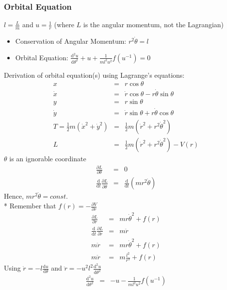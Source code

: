 \subsubsection{Orbital Equation}
\(l=\frac{L}{m}\) and \(u=\frac{1}{r}\) (where \(L\) is the angular momentum, not the Lagrangian)
\begin{itemize}
\item Conservation of Angular Momentum: \(r^2\dot{\theta}=l\)
\item Orbital Equation: \(\displaystyle\frac{\mathrm{d}^2u}{\mathrm{d}\theta^2}+u+\frac{1}{ml^2u^2}f(u^{-1})=0\)
\end{itemize}
Derivation of orbital equation(s) using Lagrange's equations:
\begin{eqnarray}
x&=&r\cos{\theta}  \nonumber \\
\dot{x}&=&\dot{r}\cos{\theta}-r\dot{\theta}\sin{\theta} \nonumber \\
y&=&r\sin{\theta} \nonumber \\
\dot{y}&=&\dot{r}\sin{\theta}+r\dot{\theta}\cos{\theta} \nonumber \\
T = \frac{1}{2}m(\dot{x}^2+\dot{y}^2) &=& \frac{1}{2}m(\dot{r}^2+r^2\dot{\theta}^2) \nonumber \\
L&=& \frac{1}{2}m(\dot{r}^2+r^2\dot{\theta}^2) - V(r) \nonumber
\end{eqnarray}
\(\theta\) is an ignorable coordinate
\begin{eqnarray}
\frac{\partial L}{\partial \theta}&=&0 \nonumber \\
\frac{\mathrm{d}}{\mathrm{d}t}\frac{\partial L}{\partial \dot{\theta}}&=&\frac{\mathrm{d}}{\mathrm{d}t}(mr^2\dot{\theta})  \nonumber
\end{eqnarray}
Hence, \(mr^2\dot{\theta} = const.\)\\*
Remember that \(f(r)=-\frac{\partial V}{\partial r}\)
\begin{eqnarray}
\frac{\partial L}{\partial r}&=&mr\dot{\theta}^2+f(r) \nonumber \\
\frac{\mathrm{d}}{\mathrm{d}t}\frac{\partial L}{\partial \dot{r}}&=&m\ddot{r}  \nonumber \\
m\ddot{r}&=&mr\dot{\theta}^2+f(r)  \nonumber \\
m\ddot{r}&=&m\frac{l^2}{r^3}+f(r)  \nonumber
\end{eqnarray}
Using \(\dot{r}=-l\frac{\mathrm{d}u}{\mathrm{d}\theta}\) and \(\ddot{r}=-u^2l^2\frac{\mathrm{d}^2u}{\mathrm{d}\theta^2}\)
\begin{eqnarray}
\frac{\mathrm{d}^2u}{\mathrm{d}\theta^2}&=&-u-\frac{1}{ml^2u^2}f(u^{-1}) \nonumber
\end{eqnarray}


